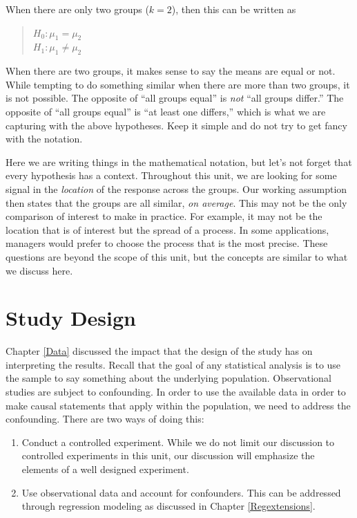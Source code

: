 \documentclass[
]{book}
\providecommand{\tightlist}{%
  \setlength{\itemsep}{0pt}\setlength{\parskip}{0pt}}
\theoremstyle{plain}
\theoremstyle{mydefn}
\theoremstyle{myexmpl}
\theoremstyle{remark}
\begin{document}
When there are only two groups (\(k = 2\)), then this can be written as

\begin{quote}
\(H_0: \mu_1 = \mu_2\)\\
\(H_1: \mu_1 \neq \mu_2\)
\end{quote}

\begin{rmdtip}
When there are two groups, it makes sense to say the means are equal or not. While tempting to do something similar when there are more than two groups, it is not possible. The opposite of ``all groups equal'' is \emph{not} ``all groups differ.'' The opposite of ``all groups equal'' is ``at least one differs,'' which is what we are capturing with the above hypotheses. Keep it simple and do not try to get fancy with the notation.
\end{rmdtip}

Here we are writing things in the mathematical notation, but let's not forget that every hypothesis has a context. Throughout this unit, we are looking for some signal in the \emph{location} of the response across the groups. Our working assumption then states that the groups are all similar, \emph{on average}. This may not be the only comparison of interest to make in practice. For example, it may not be the location that is of interest but the spread of a process. In some applications, managers would prefer to choose the process that is the most precise. These questions are beyond the scope of this unit, but the concepts are similar to what we discuss here.

\hypertarget{ANOVAdata}{%
\chapter{Study Design}\label{ANOVAdata}}

Chapter \ref{Data} discussed the impact that the design of the study has on interpreting the results. Recall that the goal of any statistical analysis is to use the sample to say something about the underlying population. Observational studies are subject to confounding. In order to use the available data in order to make causal statements that apply within the population, we need to address the confounding. There are two ways of doing this:

\begin{enumerate}
\def\labelenumi{\arabic{enumi}.}
\tightlist
\item
  Conduct a controlled experiment. While we do not limit our discussion to controlled experiments in this unit, our discussion will emphasize the elements of a well designed experiment.\\
\item
  Use observational data and account for confounders. This can be addressed through regression modeling as discussed in Chapter \ref{Regextensions}.
\end{enumerate}
\end{document}
